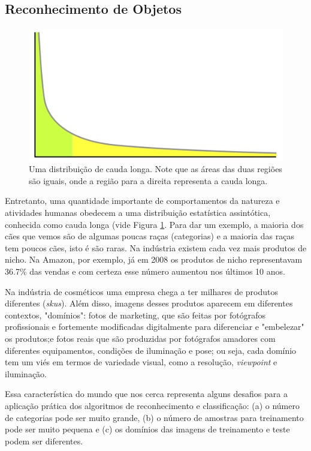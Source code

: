 \documentclass[conference]{IEEEtran}
\begin{document}
\subsection{Reconhecimento de Objetos}
\begin{figure}[ht!]
\begin{center}
\includegraphics[width=.6\columnwidth]{long-tail.png}
\caption{Uma distribuição de cauda longa. Note que as áreas das duas regiões são iguais, onde a região para a direita representa a cauda longa.}\label{cauda-longa}
\end{center}
\end{figure}

Entretanto, uma quantidade importante de comportamentos da natureza e atividades humanas obedecem a uma distribuição estatística assintótica, conhecida como cauda longa (vide Figura \ref{cauda-longa}. Para dar um exemplo, a maioria dos cães que vemos são de algumas poucas raças (categorias) e a maioria das raças tem poucos cães, isto é são raras. Na indústria existem cada vez mais produtos de nicho. Na Amazon, por exemplo, já em 2008 os produtos de nicho representavam 36.7\% das vendas \cite{erik} e com certeza esse número aumentou nos últimos 10 anos. 

Na indústria de cosméticos uma empresa chega a ter milhares de produtos diferentes (\textit{skus}). Além disso, imagens desses produtos aparecem em diferentes contextos, "domínios": fotos de marketing, que são feitas por fotógrafos profissionais e fortemente modificadas digitalmente para diferenciar e "embelezar" os produtos;e fotos reais que são produzidas por fotógrafos amadores com diferentes equipamentos, condições de iluminação e pose; ou seja, cada domínio tem um viés em termos de variedade visual, como a resolução, \textit{viewpoint} e iluminação.

Essa característica do mundo que nos cerca representa alguns desafios para a aplicação prática dos algoritmos de reconhecimento e classificação: (a) o número de categorias pode ser muito grande, (b) o número de amostras para treinamento pode ser muito pequena\cite{horn} e (c) os domínios das imagens de treinamento e teste podem ser diferentes. 
\end{document}
